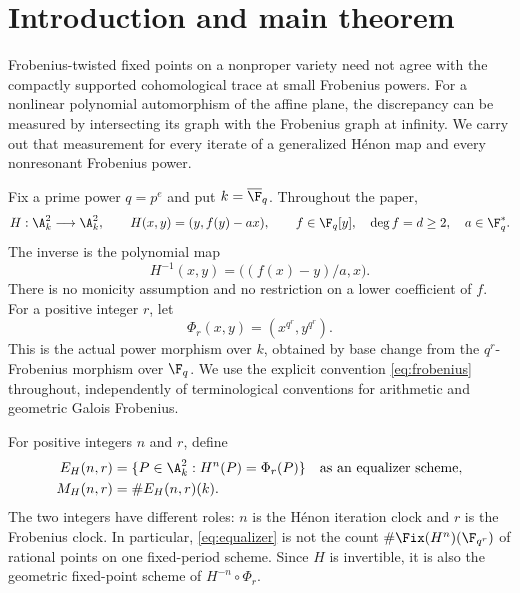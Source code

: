 \section{Introduction and main theorem}\label{sec:introduction}

Frobenius-twisted fixed points on a nonproper variety need not agree with
the compactly supported cohomological trace at small Frobenius powers.
For a nonlinear polynomial automorphism of the affine plane, the discrepancy
can be measured by intersecting its graph with the Frobenius graph at
infinity. We carry out that measurement for every iterate of a generalized
H\'enon map and every nonresonant Frobenius power.

Fix a prime power $q=p^e$ and put $k=\overline{\F}_q$. Throughout the paper,
\begin{equation}\label{eq:map}
 H:\A^2_k\longrightarrow\A^2_k,
 \qquad H(x,y)=(y,f(y)-ax),
 \qquad f\in\F_q[y],\quad \deg f=d\geq2,\quad a\in\F_q^*.
\end{equation}
The inverse is the polynomial map
\begin{equation}\label{eq:inverse}
 H^{-1}(x,y)=\bigl((f(x)-y)/a,x\bigr).
\end{equation}
There is no monicity assumption and no restriction on a lower coefficient
of $f$. For a positive integer $r$, let
\begin{equation}\label{eq:frobenius}
 \Phi_r(x,y)=(x^{q^r},y^{q^r}).
\end{equation}
This is the actual power morphism over $k$, obtained by base change from
the $q^r$-Frobenius morphism over $\F_q$. We use the explicit convention
\eqref{eq:frobenius} throughout, independently of terminological conventions
for arithmetic and geometric Galois Frobenius.

For positive integers $n$ and $r$, define
\begin{equation}\label{eq:equalizer}
 \begin{aligned}
 E_H(n,r)&=\{P\in\A^2_k:H^n(P)=\Phi_r(P)\}
       \quad\text{as an equalizer scheme},\\
 M_H(n,r)&=\#E_H(n,r)(k).
 \end{aligned}
\end{equation}
The two integers have different roles: $n$ is the H\'enon iteration clock
and $r$ is the Frobenius clock. In particular, \eqref{eq:equalizer} is not
the count $\#\Fix(H^n)(\F_{q^r})$ of rational points on one fixed-period
scheme. Since $H$ is invertible, it is also the geometric fixed-point scheme
of $H^{-n}\circ\Phi_r$.

